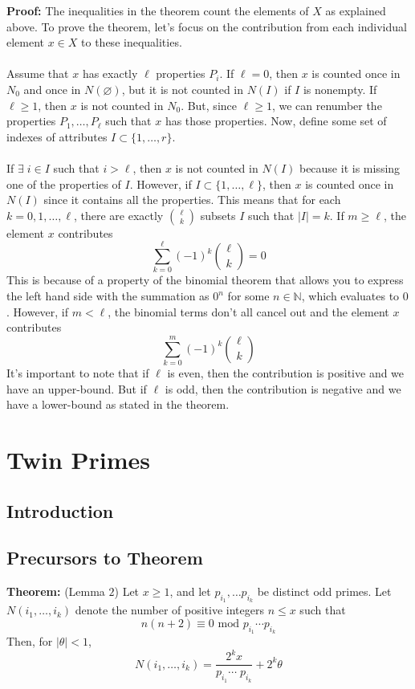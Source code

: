 \documentclass[8pt]{extarticle}
\begin{document}
\begin{boxedsection}
\textbf{Proof:} The inequalities in the theorem count the elements of $X$ as explained above. To prove the theorem, let's focus on the contribution from each individual element $x \in X$ to these inequalities.\\
\\
Assume that $x$ has exactly $\ell$ properties $P_i$. If $\ell = 0$, then $x$ is counted once in $N_0$ and once in $N(\varnothing)$, but it is not counted in $N(I)$ if $I$ is nonempty.  If $\ell \geq 1$, then $x$ is not counted in $N_0$. But, since $\ell \geq 1$, we can renumber the properties $P_1, \dots, P_\ell$ such that $x$ has those properties. Now, define some set of indexes of attributes $I \subset \{1,\dots,r\}$.\\
\\
If $\exists \; i \in I$ such that $i > \ell$, then $x$ is not counted in $N(I)$ because it is missing one of the properties of $I$. However, if $I \subset \{1,\dots,\ell\}$, then $x$ is counted once in $N(I)$ since it contains all the properties. This means that for each $k = 0,1,\dots,\ell$, there are exactly ${\ell \choose k}$ subsets $I$ such that $|I| = k$. If $m \geq \ell$, the element $x$ contributes 
$$
\sum_{k=0}^\ell (-1)^k {\ell \choose k} = 0
$$
This is because of a property of the binomial theorem that allows you to express the left hand side with the summation as $0^n$ for some $n \in \mathbb{N}$, which evaluates to $0$. However, if $m < \ell$, the binomial terms don't all cancel out and the element $x$ contributes
$$
\sum_{k=0}^m (-1)^k {\ell \choose k}
$$
It's important to note that if $\ell$ is even, then the contribution is positive and we have an upper-bound. But if $\ell$ is odd, then the contribution is negative and we have a lower-bound as stated in the theorem.
\end{boxedsection}

\pagebreak
\section{Twin Primes}
\subsection{Introduction}
\subsection{Precursors to Theorem}
\begin{boxedsection}
    \textbf{Theorem:} (Lemma $2$) Let $x \geq 1$, and let $p_{i_1}, \dots p_{i_k}$ be distinct odd primes. Let $N(i_1, \dots, i_k)$ denote the number of positive integers $n \leq x$ such that
    $$
    n(n+2) \equiv 0 \text{ mod } p_{i_1} \cdots p_{i_k}
    $$
    Then, for $|\theta| < 1$,
    $$
    N(i_1, \dots, i_k) = \frac{2^k x}{p_{i_1} \cdots \;p_{i_k}} + 2^k\theta
    $$
\end{boxedsection}
\end{document}
